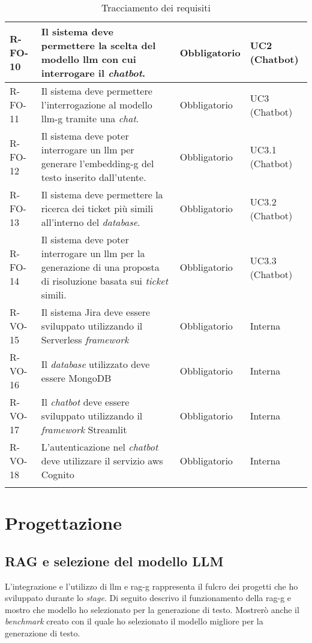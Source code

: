 \begin{longtable}{|p{1.5cm}|p{5.5cm}|p{2cm}|p{2.5cm}|}
    \hline
    R-FO-10 & Il sistema deve permettere la scelta del modello \gls{llm} con cui interrogare il \textit{chatbot}. & Obbligatorio & UC2 (Chatbot) \\
    \hline
    R-FO-11 & Il sistema deve permettere l'interrogazione al modello \gls{llm-g} tramite una \textit{chat}. & Obbligatorio & UC3 (Chatbot) \\
    \hline
    R-FO-12 & Il sistema deve poter interrogare un \gls{llm} per generare l'\gls{embedding-g} del testo inserito dall'utente. & Obbligatorio & UC3.1 (Chatbot) \\
    \hline
    R-FO-13 & Il sistema deve permettere la ricerca dei ticket più simili all'interno del \textit{database}. & Obbligatorio & UC3.2 (Chatbot) \\
    \hline
    R-FO-14 & Il sistema deve poter interrogare un \gls{llm} per la generazione di una proposta di risoluzione basata sui \textit{ticket} simili. & Obbligatorio & UC3.3 (Chatbot) \\
    \hline
    R-VO-15 & Il sistema Jira deve essere sviluppato utilizzando il Serverless \textit{framework}  & Obbligatorio & Interna \\
    \hline
    R-VO-16 & Il \textit{database} utilizzato deve essere MongoDB & Obbligatorio & Interna \\
    \hline
    R-VO-17 & Il \textit{chatbot} deve essere sviluppato utilizzando il \textit{framework} Streamlit & Obbligatorio & Interna \\
    \hline
    R-VO-18 & L'autenticazione nel \textit{chatbot} deve utilizzare il servizio \gls{aws} Cognito & Obbligatorio & Interna \\

    
    \hline
    \caption{Tracciamento dei requisiti}
    \label{tab:tracciamentoRequisiti}
\end{longtable}

\section{Progettazione}
\subsection{RAG e selezione del modello LLM} \label{sec:rag}
L'integrazione e l'utilizzo di \gls{llm} e \gls{rag-g} rappresenta il fulcro dei progetti che ho sviluppato durante lo \textit{stage}.
Di seguito descrivo il funzionamento della \gls{rag-g} e mostro che modello ho selezionato per la generazione di testo. Mostrerò anche il \textit{benchmark} creato con il quale ho selezionato il modello migliore per la generazione di testo.
